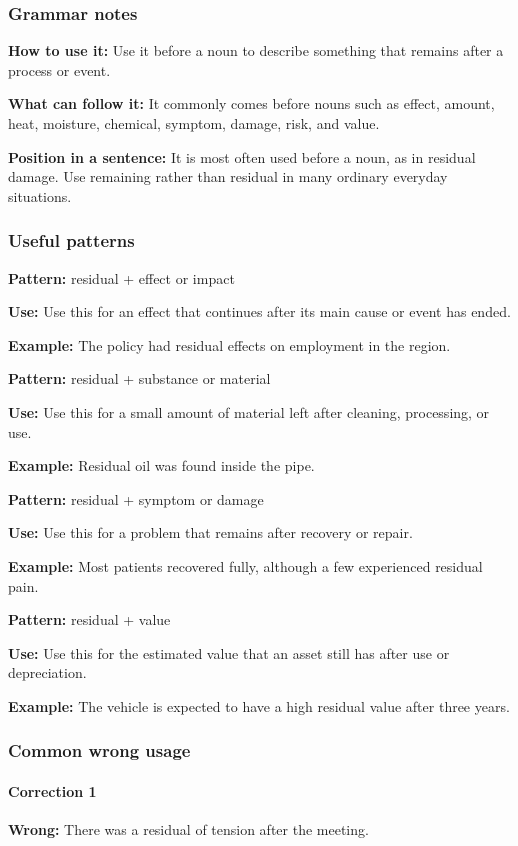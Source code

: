 \documentclass[11pt]{article}
\begin{document}
\subsubsection{Grammar notes}
\textbf{How to use it:} Use it before a noun to describe something that remains after a process or event.

\textbf{What can follow it:} It commonly comes before nouns such as effect, amount, heat, moisture, chemical, symptom, damage, risk, and value.

\textbf{Position in a sentence:} It is most often used before a noun, as in residual damage. Use remaining rather than residual in many ordinary everyday situations.

\subsubsection{Useful patterns}
\textbf{Pattern:} residual + effect or impact

\textbf{Use:} Use this for an effect that continues after its main cause or event has ended.

\textbf{Example:} The policy had residual effects on employment in the region.

\textbf{Pattern:} residual + substance or material

\textbf{Use:} Use this for a small amount of material left after cleaning, processing, or use.

\textbf{Example:} Residual oil was found inside the pipe.

\textbf{Pattern:} residual + symptom or damage

\textbf{Use:} Use this for a problem that remains after recovery or repair.

\textbf{Example:} Most patients recovered fully, although a few experienced residual pain.

\textbf{Pattern:} residual + value

\textbf{Use:} Use this for the estimated value that an asset still has after use or depreciation.

\textbf{Example:} The vehicle is expected to have a high residual value after three years.

\subsubsection{Common wrong usage}
\paragraph{Correction 1}
\textbf{Wrong:} There was a residual of tension after the meeting.
\end{document}
